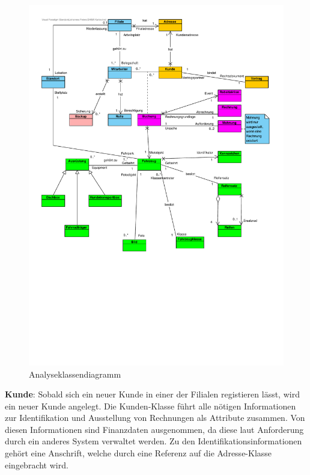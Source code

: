 \begin{figure}[!ht]
    \centering
    \includegraphics[width=\textwidth, trim = 0cm 9cm 0cm 0cm]{Bilder/Diagramme/Analyseklassendiagramm.pdf}
    \caption{Analyseklassendiagramm}
    \label{img:akd}
\end{figure}

\newpage

\textbf{Kunde}: Sobald sich ein neuer Kunde in einer der Filialen registieren lässt, wird ein neuer Kunde angelegt. Die Kunden-Klasse führt alle nötigen Informationen zur Identifikation und Ausstellung von Rechnungen als Attribute zusammen. Von diesen Informationen sind Finanzdaten ausgenommen, da diese laut Anforderung durch ein anderes System verwaltet werden. Zu den Identifikationsinformationen gehört eine Anschrift, welche durch eine Referenz auf die Adresse-Klasse eingebracht wird. 

